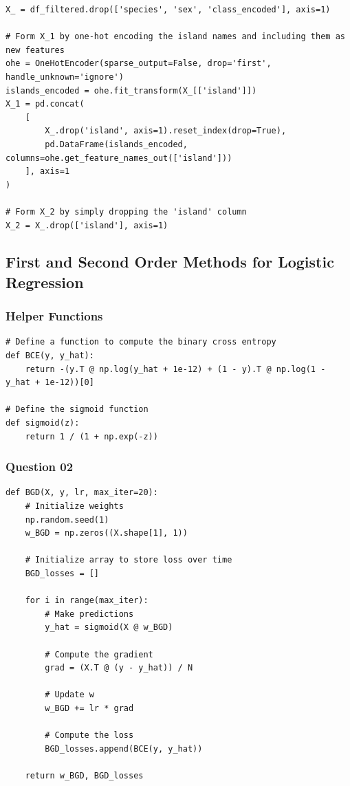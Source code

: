 \documentclass{article}[a4paper]
\begin{document}
	\begin{lstlisting}[caption={Fix for the error}, label=errorfix]
X_ = df_filtered.drop(['species', 'sex', 'class_encoded'], axis=1)

# Form X_1 by one-hot encoding the island names and including them as new features
ohe = OneHotEncoder(sparse_output=False, drop='first', handle_unknown='ignore')
islands_encoded = ohe.fit_transform(X_[['island']])
X_1 = pd.concat(
    [
        X_.drop('island', axis=1).reset_index(drop=True),
        pd.DataFrame(islands_encoded, columns=ohe.get_feature_names_out(['island']))
    ], axis=1
)

# Form X_2 by simply dropping the 'island' column
X_2 = X_.drop(['island'], axis=1)
	\end{lstlisting}

	\subsection{First and Second Order Methods for Logistic Regression}

	\subsubsection{Helper Functions}
	\begin{lstlisting}[caption={Functions to compute BCE and the sigmoid}]
# Define a function to compute the binary cross entropy
def BCE(y, y_hat):
    return -(y.T @ np.log(y_hat + 1e-12) + (1 - y).T @ np.log(1 - y_hat + 1e-12))[0]

# Define the sigmoid function
def sigmoid(z):
    return 1 / (1 + np.exp(-z))
	\end{lstlisting}

	\subsubsection{Question 02}
	\begin{lstlisting}[caption={Batch Gradient Descent}, label=bgd]
def BGD(X, y, lr, max_iter=20):
    # Initialize weights
    np.random.seed(1)
    w_BGD = np.zeros((X.shape[1], 1))

    # Initialize array to store loss over time
    BGD_losses = []

    for i in range(max_iter):
        # Make predictions
        y_hat = sigmoid(X @ w_BGD)

        # Compute the gradient
        grad = (X.T @ (y - y_hat)) / N

        # Update w
        w_BGD += lr * grad

        # Compute the loss
        BGD_losses.append(BCE(y, y_hat))
    
    return w_BGD, BGD_losses		
	\end{lstlisting}
\end{document}
